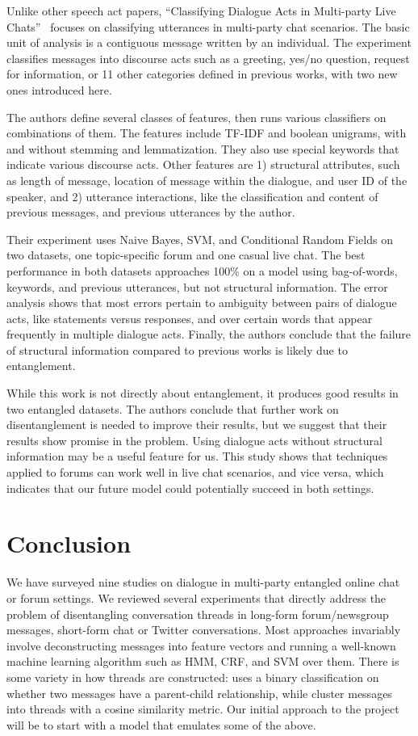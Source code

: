\documentclass[10pt]{article}
\newcommand{\titlecite}[2]{``#1''~\cite{#2}}
\begin{document}
Unlike other speech act papers, \titlecite{Classifying Dialogue Acts in Multi-party Live Chats}{Kim2012} 
focuses on classifying utterances
in multi-party chat scenarios. The basic unit
of analysis is a contiguous message written by an individual. The
experiment classifies messages into discourse acts such as a greeting, yes/no
question, request for information, or 11 other categories defined in previous
works, with two new ones introduced here.

The authors define several classes of features, then runs various classifiers on
combinations of them. The features include TF-IDF and boolean unigrams, with
and without stemming and lemmatization. They also use special keywords 
that indicate various discourse acts. Other
features are 1) structural attributes, such as length of message, location of
message within the dialogue, and user ID of the speaker, and 2) utterance
interactions, like the classification and content of previous messages, and
previous utterances by the author.

Their experiment uses Naive Bayes, SVM, and Conditional Random Fields on two
datasets, one topic-specific forum and one casual live chat. The best
performance in both datasets approaches 100\% on a model using bag-of-words,
keywords, and previous utterances, but not structural information. The error
analysis shows that most errors pertain to ambiguity between pairs of dialogue
acts, like statements versus responses, and over certain words that appear
frequently in multiple dialogue acts. Finally, the authors conclude that the
failure of structural information compared to previous works is likely due to
entanglement.

While this work is not directly about entanglement, it produces good results in
two entangled datasets. The authors conclude that further work on
disentanglement is needed to improve their results, but we suggest that their
results show promise in the problem. Using
dialogue acts without structural information may be a useful feature
for us. This study shows that techniques applied to forums can work well
in live chat scenarios, and vice versa, which indicates that our future model
could potentially succeed in both settings.

\section{Conclusion}

We have surveyed nine studies on dialogue in multi-party entangled online 
chat or forum settings. We reviewed several experiments that directly address
the problem of disentangling conversation threads in long-form forum/newsgroup messages,
short-form chat or Twitter conversations. Most approaches
invariably involve deconstructing messages into feature vectors and running a 
well-known machine learning algorithm such as HMM, CRF, and SVM over them.
There is some variety in how threads are constructed: \cite{Aumayr2011a} uses
a binary classification on whether two messages have a parent-child
relationship, while \cite{Mayfield2012a} cluster messages into threads with 
a cosine similarity metric. Our initial approach to the project will be to 
start with a model that emulates some of the above.
\end{document}
